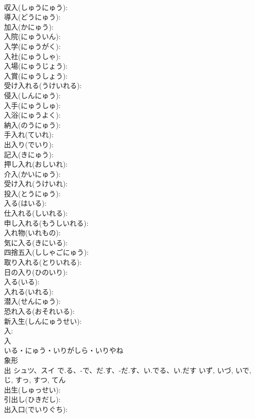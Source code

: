 \documentclass[8pt]{extreport}
\begin{document}
\begin{CJK}{UTF8}{min}
\\	収入(しゅうにゅう): 
\\	導入(どうにゅう): 
\\	加入(かにゅう): 
\\	入院(にゅういん): 
\\	入学(にゅうがく): 
\\	入社(にゅうしゃ): 
\\	入場(にゅうじょう): 
\\	入賞(にゅうしょう): 
\\	受け入れる(うけいれる): 
\\	侵入(しんにゅう): 
\\	入手(にゅうしゅ): 
\\	入浴(にゅうよく): 
\\	納入(のうにゅう): 
\\	手入れ(ていれ): 
\\	出入り(でいり): 
\\	記入(きにゅう): 
\\	押し入れ(おしいれ): 
\\	介入(かいにゅう): 
\\	受け入れ(うけいれ): 
\\	投入(とうにゅう): 
\\	入る(はいる): 
\\	仕入れる(しいれる): 
\\	申し入れる(もうしいれる): 
\\	入れ物(いれもの): 
\\	気に入る(きにいる): 
\\	四捨五入(ししゃごにゅう): 
\\	取り入れる(とりいれる): 
\\	日の入り(ひのいり): 
\\	入る(いる): 
\\	入れる(いれる): 
\\	潜入(せんにゅう): 
\\	恐れ入る(おそれいる): 
\\	新入生(しんにゅうせい): 
\\	入: 
\\	入	
\\	いる・にゅう・いりがしら・いりやね	
\\	象形 
\\	出	シュツ、スイ	で.る、-で、だ.す、-だ.す、い.でる、い.だす	いず, いづ, いで, じ, すっ, すつ, てん	
\\	出生(しゅっせい): 
\\	引出し(ひきだし): 
\\	出入口(でいりぐち): 

\end{CJK}
\end{document}
